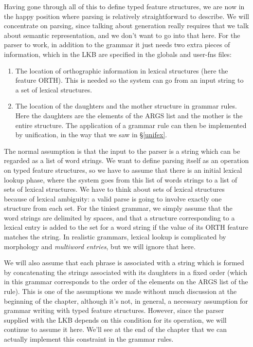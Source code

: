 \documentclass[12pt]{report}
\begin{document}
Having gone through all of this to define typed feature
structures, we are now in the happy position where parsing 
is relatively straightforward to describe.  
We will concentrate on parsing, since 
talking about generation really requires that we talk about semantic
representation, and we don't want to go into that here.
For the parser to work, in addition to the grammar
it just needs two extra pieces of
information, which in the LKB are specified in the globals and user-fns files:
\begin{enumerate}
\item The location of orthographic information in lexical structures
(here the feature ORTH).  This is needed so the system can go
from an input string to a set of lexical structures.
\item The location of the daughters and the mother structure in
grammar rules.  Here the daughters are the elements of the ARGS list
and the mother is the entire structure.  The application of
a grammar rule can then be implemented by unification, in the way that
we saw in \S\ref{unifex}. 
\end{enumerate}

The normal assumption is that
the input to the parser is a string which can be regarded
as a list of word strings.  We want to define parsing itself as an 
operation on typed feature structures, so we have to assume that
there is an initial lexical lookup phase, where the system
goes from this list of words strings to a list of sets of lexical
structures.  We have to think about sets of lexical
structures because of lexical
ambiguity: a valid parse is going to involve exactly one structure from
each set.  For the tiniest grammar, we simply assume that the word
strings are delimited by spaces, and that a structure corresponding
to a lexical entry
is added to the set for a word string if the value of its ORTH feature
matches the string.  In realistic grammars, lexical lookup is complicated
by morphology and {\it multiword entries}, but we will ignore that here.

We will
also assume that each phrase is associated with a string
which is formed by concatenating the strings associated with 
its daughters in a fixed order (which in this grammar corresponds
to the order of the elements on the ARGS list of the rule).
This is one of the assumptions we made without much discussion
at the beginning of the chapter, although it's not, in general,
a necessary assumption
for grammar writing with typed feature structures.
However, since the parser supplied with the LKB
depends on this condition for its operation, we will continue to
assume it here.  We'll see at the end of the chapter that
we can actually implement this constraint in the grammar rules.
\end{document}

